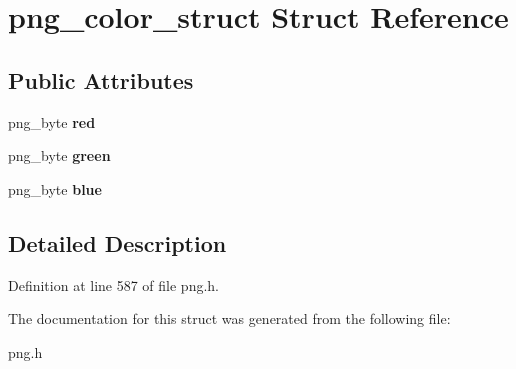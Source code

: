 \hypertarget{structpng__color__struct}{\section{png\+\_\+color\+\_\+struct Struct Reference}
\label{structpng__color__struct}
}
\subsection*{Public Attributes}
\begin{DoxyCompactItemize}
\item 
\hypertarget{structpng__color__struct_ad39dc2d7cb82e3670a3ad397bb4083cb}{png\+\_\+byte {\bfseries red}}\label{structpng__color__struct_ad39dc2d7cb82e3670a3ad397bb4083cb}

\item 
\hypertarget{structpng__color__struct_ada9b5a911b185eaf7c6b87934e9f11ce}{png\+\_\+byte {\bfseries green}}\label{structpng__color__struct_ada9b5a911b185eaf7c6b87934e9f11ce}

\item 
\hypertarget{structpng__color__struct_a528e625b2778e787dc182e5df1164bbc}{png\+\_\+byte {\bfseries blue}}\label{structpng__color__struct_a528e625b2778e787dc182e5df1164bbc}

\end{DoxyCompactItemize}


\subsection{Detailed Description}


Definition at line 587 of file png.\+h.



The documentation for this struct was generated from the following file\+:\begin{DoxyCompactItemize}
\item 
png.\+h\end{DoxyCompactItemize}
